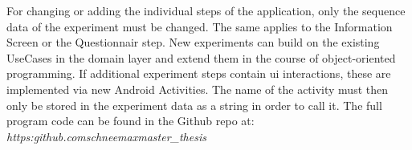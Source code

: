 For changing or adding the individual steps of the application, only the sequence data of the experiment must be changed. The same applies to the Information Screen or the Questionnair step. New experiments can build on the existing UseCases in the domain layer and extend them in the course of object-oriented programming. If additional experiment steps contain \ac{ui} interactions, these are implemented via new Android Activities. The name of the activity must then only be stored in the experiment data as a string in order to call it. The full program code can be found in the Github repo at: \textit{https:\/\/github.com\/schneemax\/master\_thesis}